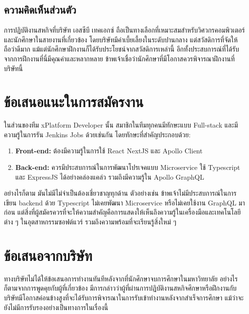 \subsection{ความคิดเห็นส่วนตัว}
การปฏิบัติงานสหกิจที่บริษัท เอสซีบี เทคเอกซ์ ถือเป็นทางเลือกที่เหมาะสมสำหรับวิศวกรคอมพิวเตอร์และนักศึกษาในสายงานที่เกี่ยวข้อง โดยบริษัทมีค่าเบี้ยเลี้ยงในระดับปานกลาง แต่สวัสดิการที่จัดให้ถือว่าดีมาก แม้แต่นักศึกษาฝึกงานก็ได้รับประโยชน์จากสวัสดิการเหล่านี้ อีกทั้งประสบการณ์ที่ได้รับจากการฝึกงานที่นี่มีคุณค่าและหลากหลาย ข้าพเจ้าเชื่อว่านักศึกษาที่มีโอกาสควรพิจารณาฝึกงานที่บริษัทนี้

\section{ข้อเสนอแนะในการสมัครงาน}
ในส่วนของทีม xPlatform Developer นั้น สมาชิกในทีมทุกคนมีทักษะแบบ Full-stack และมีความรู้ในการรัน Jenkins Jobs ด้วยเช่นกัน โดยทักษะที่สำคัญประกอบด้วย:

\begin{enumerate}
    \item \textbf{Front-end: } ต้องมีความรู้ในการใช้ React NextJS และ Apollo Client
    \item \textbf{Back-end: } ควรมีประสบการณ์ในการพัฒนาโปรเจคแบบ Microservice ใช้ Typescript และ ExpressJS ได้อย่างคล่องแคล่ว รวมถึงมีความรู้ใน Apollo GraphQL
\end{enumerate}

อย่างไรก็ตาม มันไม่มีไม่จำเป็นต้องเชี่ยวชาญทุกด้าน ตัวอย่างเช่น ข้าพเจ้าไม่มีประสบการณ์ในการเขียน backend ด้วย Typescript ไม่เคยพัฒนา Microservice หรือไม่เคยใช้งาน GraphQL มาก่อน แต่สิ่งที่ผู้สมัครควรที่จะให้ความสำคัญคือการแสดงให้เห็นถึงความรู้ในเครื่องมือและเทคโนโลยีต่าง ๆ ในอุตสาหกรรมซอฟต์แวร์ รวมถึงความพร้อมที่จะเรียนรู้สิ่งใหม่ ๆ

\section{ข้อเสนอจากบริษัท}
ทางบริษัทไม่ได้ให้ข้อเสนอการทำงานทันทีหลังจากที่นักศึกษาจบการศึกษาในมหาวิทยาลัย อย่างไรก็ตามจากการพูดคุยกับผู้ที่เกี่ยวข้อง มีการกล่าวว่าผู้ที่ผ่านการปฏิบัติงานสหกิจศึกษาหรือฝึกงานกับบริษัทมีโอกาสค่อนข้างสูงที่จะได้รับการพิจารณาในการรับเข้าทำงานหลังจากสำเร็จการศึกษา แม้ว่าจะยังไม่มีการรับรองอย่างเป็นทางการในเรื่องนี้

